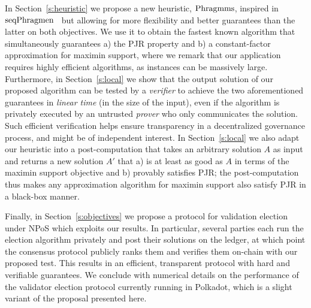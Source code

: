 In Section~\ref{s:heuristic} we propose a new heuristic, $\operatorname{Phragmms}$, inspired in $\operatorname{seqPhragmen}$~\cite{brill2017phragmen} but allowing for more flexibility and better guarantees than the latter on both objectives. We use it to obtain the fastest known algorithm that simultaneously guarantees a) the PJR property and b) a constant-factor approximation for maximin support, where we remark that our application requires highly efficient algorithms, as instances can be massively large. 
%
Furthermore, in Section~\ref{s:local} we show that the output solution of our proposed algorithm can be tested by a \emph{verifier} to achieve the two aforementioned guarantees in \emph{linear time} (in the size of the input), even if the algorithm is privately executed by an untrusted \emph{prover} who only communicates the solution. Such efficient verification helps ensure transparency in a decentralized governance process, and might be of independent interest. 
%
In Section~\ref{s:local} we also adapt our heuristic into a post-computation that takes an arbitrary solution $A$ as input and returns a new solution $A'$ that a) is at least as good as $A$ in terms of the maximin support objective and b) provably satisfies PJR; the post-computation thus makes any approximation algorithm for maximin support also satisfy PJR in a black-box manner.

Finally, in Section~\ref{s:objectives} we propose a protocol for validation election under NPoS which exploits our results. 
In particular, several parties each run the election algorithm privately 
and post their solutions on the ledger, at which point the consensus protocol publicly ranks them and verifies them on-chain with our proposed test.  
This results in an efficient, transparent protocol with hard and verifiable guarantees. 
We conclude with numerical details on the performance of the validator election protocol currently running in Polkadot, which is a slight variant of the proposal presented here.